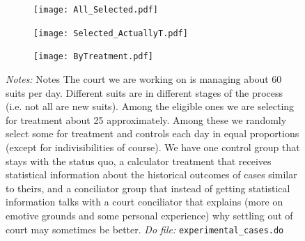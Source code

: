 \documentclass[11pt]{article}
\begin{document}
      
\begin{figure}[H]
\caption{Number of experimental cases: overall, selected and actually treated. - Pilot}
\label{treatmentunits}
\begin{center}
    \begin{subfigure}{0.49\textwidth}
        \caption{}
        \centering
        \texttt{[image: All\_Selected.pdf]}
    \end{subfigure}
    \begin{subfigure}{0.49\textwidth}
        \caption{}
        \centering
        \texttt{[image: Selected\_ActuallyT.pdf]}
    \end{subfigure}
    \hfill
        \begin{subfigure}{0.49\textwidth}
            \caption{}
            \centering
            \texttt{[image: ByTreatment.pdf]}    
        \end{subfigure}
    \end{center}
     {\footnotesize \textit{Notes: } Notes 
    The court we are working on is managing about 60 suits per day. Different suits are in different stages of the process (i.e. not all are new suits). Among the eligible ones we are selecting for treatment about 25 approximately. Among these we randomly select some for treatment and controls each day in equal proportions (except for indivisibilities of course). We have one control group that stays with the status quo, a calculator treatment that receives statistical information about the historical outcomes of cases similar to theirs, and a conciliator group that instead of getting statistical information talks with a court conciliator that explains (more on emotive grounds and some personal experience) why settling out of court may sometimes be better.}
      {\footnotesize \textit{Do file: }  \texttt{experimental\_cases.do}}
\end{figure}
\end{document}
